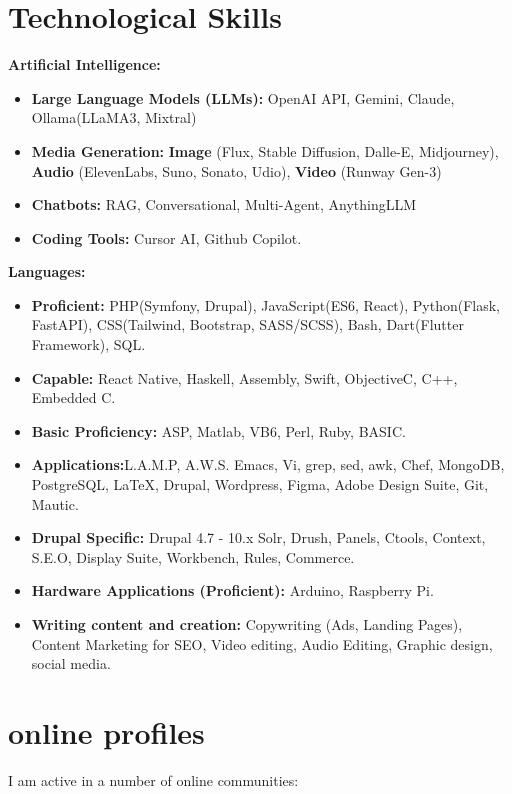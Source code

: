 \documentclass[]{friggeri-cv} %
\begin{document}
\section{Technological Skills}
\textbf{Artificial Intelligence:}
\begin{itemize}
\item \textbf{Large Language Models (LLMs): } OpenAI API, Gemini, Claude, Ollama(LLaMA3, Mixtral)
\item \textbf{Media Generation:} \textbf{Image} (Flux, Stable Diffusion, Dalle-E, Midjourney), \textbf{Audio} (ElevenLabs, Suno, Sonato, Udio),  \textbf{Video} (Runway Gen-3)
\item \textbf{Chatbots:} RAG, Conversational, Multi-Agent, AnythingLLM
\item \textbf{Coding Tools:} Cursor AI, Github Copilot.
\end{itemize}
\textbf{Languages:}
\begin{itemize}
\item \textbf{Proficient: }PHP(Symfony, Drupal), JavaScript(ES6, React), Python(Flask, FastAPI), CSS(Tailwind, Bootstrap, SASS/SCSS), Bash, Dart(Flutter Framework), SQL.
\item \textbf{Capable: } React Native, Haskell, Assembly, Swift, Objective\-C, C++, Embedded C.
\item \textbf{Basic Proficiency: }ASP, Matlab, VB6, Perl, Ruby, BASIC.
\item \textbf{Applications:}L.A.M.P, A.W.S. Emacs, Vi, grep, sed, awk, Chef, MongoDB, PostgreSQL, \LaTeX, Drupal, Wordpress, Figma, Adobe Design Suite, Git, Mautic.
\item \textbf{Drupal Specific: } Drupal 4.7 - 10.x Solr, Drush, Panels, Ctools, Context, S.E.O, Display Suite, Workbench, Rules, Commerce.
\item \textbf{Hardware Applications (Proficient):} Arduino, Raspberry Pi.
\item \textbf{Writing content and creation:} Copywriting (Ads, Landing Pages), Content Marketing for SEO, Video editing, Audio Editing, Graphic design, social media.
\end{itemize}


\section{online profiles}
I am active in a number of online communities:
\end{document}
